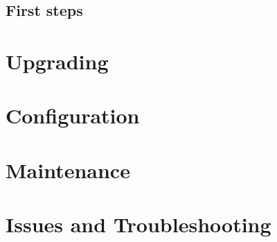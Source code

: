 \subsection{First steps}
\section{Upgrading}
\section{Configuration}
\section{Maintenance}
\section{Issues and Troubleshooting}


